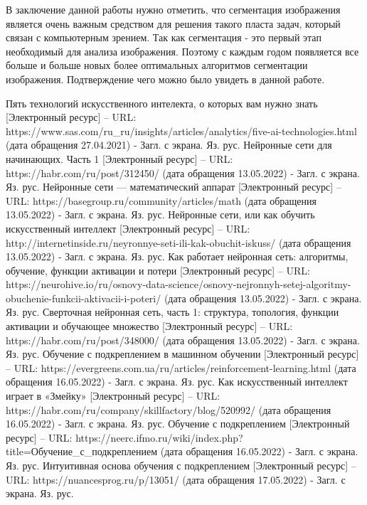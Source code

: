 \documentclass[bachelor, och, coursework]{shiza}
\begin{document}
В заключение данной работы нужно отметить, что сегментация изображения является очень важным средством для решения такого пласта задач, который связан с 
компьютерным зрением. Так как сегментация - это первый этап необходимый для анализа изображения. Поэтому с каждым годом появляется все больше и больше 
новых более оптимальных алгоритмов сегментации изображения. Подтверждение чего можно было увидеть в данной работе.

\begin{thebibliography}{3}
    Пять технологий искусственного интелекта, о которых вам нужно знать [Электронный ресурс] – URL: https://www.sas.com/ru_ru/insights/articles/analytics/five-ai-technologies.html (дата обращения 27.04.2021) - Загл. с экрана. Яз. рус.
    Нейронные сети для начинающих. Часть 1 [Электронный ресурс] – URL: https://habr.com/ru/post/312450/ (дата обращения 13.05.2022) - Загл. с экрана. Яз. рус.
    Нейронные сети — математический аппарат [Электронный ресурс] – URL: https://basegroup.ru/community/articles/math (дата обращения 13.05.2022) - Загл. с экрана. Яз. рус.
    Нейронные сети, или как обучить искусственный интеллект [Электронный ресурс] – URL: http://internetinside.ru/neyronnye-seti-ili-kak-obuchit-iskuss/ (дата обращения 13.05.2022) - Загл. с экрана. Яз. рус.
    Как работает нейронная сеть: алгоритмы, обучение, функции активации и потери [Электронный ресурс] – URL: https://neurohive.io/ru/osnovy-data-science/osnovy-nejronnyh-setej-algoritmy-obuchenie-funkcii-aktivacii-i-poteri/ (дата обращения 13.05.2022) - Загл. с экрана. Яз. рус.
    Сверточная нейронная сеть, часть 1: структура, топология, функции активации и обучающее множество [Электронный ресурс] – URL: https://habr.com/ru/post/348000/ (дата обращения 13.05.2022) - Загл. с экрана. Яз. рус.
    Обучение с подкреплением в машинном обучении [Электронный ресурс] – URL: https://evergreens.com.ua/ru/articles/reinforcement-learning.html (дата обращения 16.05.2022) - Загл. с экрана. Яз. рус.
    Как искусственный интеллект играет в «Змейку» [Электронный ресурс] – URL: https://habr.com/ru/company/skillfactory/blog/520992/ (дата обращения 16.05.2022) - Загл. с экрана. Яз. рус.
    Обучение с подкреплением [Электронный ресурс] – URL: https://neerc.ifmo.ru/wiki/index.php?title=Обучение_с_подкреплением (дата обращения 16.05.2022) - Загл. с экрана. Яз. рус.
    Интуитивная основа обучения с подкреплением [Электронный ресурс] – URL: https://nuancesprog.ru/p/13051/ (дата обращения 17.05.2022) - Загл. с экрана. Яз. рус.

\end{thebibliography}
\end{document}
